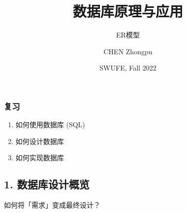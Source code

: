 \documentclass[aspectratio=169, 14pt]{beamer}
\title[Database Principles and Applications] %
{数据库原理与应用}
\subtitle{ER模型}
\author[CHEN Zhongpu] %
{CHEN Zhongpu}
\institute[] %
{
  School of Computing and Artificial Intelligence \\
  \href{mailto:zpchen@swufe.edu.cn}{zpchen@swufe.edu.cn}
}
\date[] %
{SWUFE, Fall 2022}
\begin{document}
\frame{\titlepage}

\begin{frame}
    \frametitle{复习}
    \begin{center}
        \LARGE {}
    \end{center}
    \begin{enumerate}
        \item 如何使用数据库 (SQL)
        \item \alert{如何设计数据库}
        \item 如何实现数据库
    \end{enumerate}

\end{frame}

{
    \begin{frame}
        \section{\textcolor{darkmidnightblue}{1. 数据库设计概览}}
        如何将「需求」变成最终设计？
    \end{frame}
}
\end{document}
